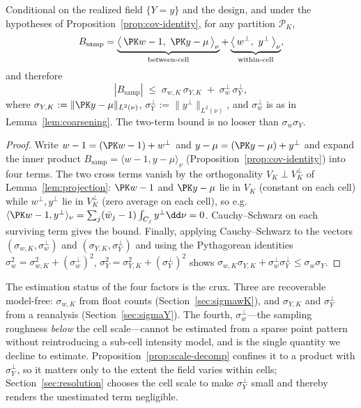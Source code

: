 \begin{proposition}
\label{prop:scale-decomp}
Conditional on the realized field $\{Y=y\}$ and the design, and under
the hypotheses of Proposition~\ref{prop:cov-identity}, for any
partition $\mathcal{P}_K$,
\[
  B_{\mathrm{samp}}
  =\underbrace{\big\langle\,\PK w-1,\ \PK y-\mu\,\big\rangle_\nu}_{\text{between-cell}}
  +\underbrace{\big\langle\,w^{\perp},\ y^{\perp}\,\big\rangle_\nu}_{\text{within-cell}},
\]
and therefore
\[
  |B_{\mathrm{samp}}|
  \;\le\; \sigma_{w,K}\,\sigma_{Y,K}\;+\;\sigma_w^{\perp}\,\sigma_Y^{\perp},
\]
where $\sigma_{Y,K}:=\|\PK y-\mu\|_{L^2(\nu)}$,
$\sigma_Y^{\perp}:=\|y^{\perp}\|_{L^2(\nu)}$, and $\sigma_w^{\perp}$ is
as in Lemma~\ref{lem:coarsening}. The two-term bound is no looser than
$\sigma_w\sigma_Y$.
\end{proposition}

\begin{proof}
Write $w-1=(\PK w-1)+w^{\perp}$ and $y-\mu=(\PK y-\mu)+y^{\perp}$ and
expand the inner product $B_{\mathrm{samp}}=\langle w-1,y-\mu\rangle_\nu$
(Proposition~\ref{prop:cov-identity}) into four terms. The two cross
terms vanish by the orthogonality $V_K\perp V_K^{\perp}$ of
Lemma~\ref{lem:projection}: $\PK w-1$ and $\PK y-\mu$ lie in $V_K$
(constant on each cell) while $w^{\perp},y^{\perp}$ lie in
$V_K^{\perp}$ (zero average on each cell), so e.g.
$\langle\PK w-1,y^{\perp}\rangle_\nu=\sum_j(\bar w_j-1)\int_{C_j}y^{\perp}\dd\nu=0$.
Cauchy--Schwarz on each surviving term gives the bound. Finally,
applying Cauchy--Schwarz to the vectors
$(\sigma_{w,K},\sigma_w^{\perp})$ and
$(\sigma_{Y,K},\sigma_Y^{\perp})$ and using the Pythagorean identities
$\sigma_w^2=\sigma_{w,K}^2+(\sigma_w^{\perp})^2$,
$\sigma_Y^2=\sigma_{Y,K}^2+(\sigma_Y^{\perp})^2$ shows
$\sigma_{w,K}\sigma_{Y,K}+\sigma_w^{\perp}\sigma_Y^{\perp}\le\sigma_w\sigma_Y$.
\end{proof}

The estimation status of the four factors is the crux. Three are
recoverable model-free: $\sigma_{w,K}$ from float counts
(Section~\ref{sec:sigmawK}), and $\sigma_{Y,K}$ and $\sigma_Y^{\perp}$
from a reanalysis (Section~\ref{sec:sigmaY}). The fourth,
$\sigma_w^{\perp}$---the sampling roughness \emph{below} the cell
scale---cannot be estimated from a sparse point pattern without
reintroducing a sub-cell intensity model, and is the single quantity we
decline to estimate. Proposition~\ref{prop:scale-decomp} confines it to
a product with $\sigma_Y^{\perp}$, so it matters only to the extent the
field varies within cells; Section~\ref{sec:resolution} chooses the
cell scale to make $\sigma_Y^{\perp}$ small and thereby renders the
unestimated term negligible.

